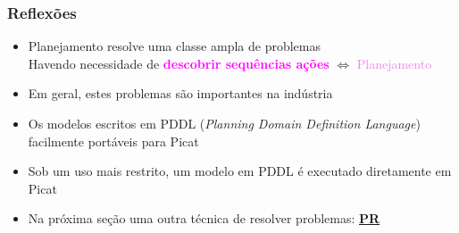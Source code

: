 \begin{frame}[fragile]
\frametitle{Reflexões}


\begin{itemize}
  \item Planejamento resolve uma classe ampla de problemas\\
   Havendo necessidade de
    \textcolor{magenta}{\textbf{descobrir sequências ações}} $\Leftrightarrow$ \textcolor{violet}{Planejamento}

  \pause
  \item Em geral, estes problemas são importantes na indústria

  \pause
  \item Os modelos escritos em PDDL (\textit{Planning Domain Definition Language})
  facilmente portáveis para Picat
    \pause
  \item Sob um uso mais restrito, um modelo em PDDL é executado diretamente em Picat
    
  \pause
  \item Na próxima seção uma outra técnica de resolver problemas: \textbf{\underline{PR}}
\end{itemize}

\end{frame}
